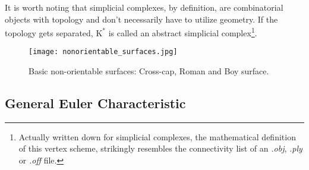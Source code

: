 It is worth noting that simplicial complexes, by definition, are combinatorial objects with topology and don't necessarily have to utilize geometry.
If the topology gets separated, $\mathrm{K}^{*}$ is called an abstract simplicial complex\footnote{ Actually written down for simplicial complexes, the mathematical definition of this vertex scheme, strikingly resembles the connectivity list of an \textit{.obj}, \textit{.ply} or \textit{.off} file.}.
\begin{figure}[ht]
\centering
\texttt{[image: nonorientable\_surfaces.jpg]}
\caption[Non-orientable surfaces]{Basic non-orientable surfaces: Cross-cap, Roman and Boy surface.}
\label{fig:nonorientable_surfaces}
\end{figure}

\subsection{General Euler Characteristic}
\label{math_euler}

